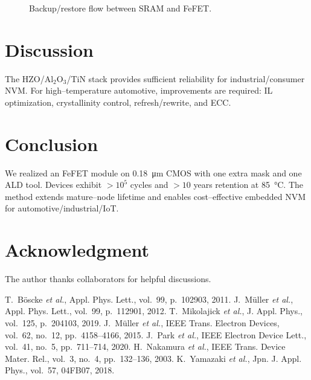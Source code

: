 \documentclass[conference]{IEEEtran}
\begin{document}
\begin{figure}[t]
\centering
{}
\caption{Backup/restore flow between SRAM and FeFET.}
\label{fig:backup}
\end{figure}

\section{Discussion}
The HZO/Al\(_2\)O\(_3\)/TiN stack provides sufficient reliability for industrial/consumer NVM.
For high–temperature automotive, improvements are required: IL optimization, crystallinity control, refresh/rewrite, and ECC.

\section{Conclusion}
We realized an FeFET module on \SI{0.18}{\micro m} CMOS with one extra mask and one ALD tool.
Devices exhibit \(>\!10^{5}\) cycles and \(>\!10\) years retention at \SI{85}{\celsius}.
The method extends mature–node lifetime and enables cost–effective embedded NVM for automotive/industrial/IoT.

\section*{Acknowledgment}
The author thanks collaborators for helpful discussions.

\begin{thebibliography}{99}
 T.~Böscke \emph{et al.}, Appl. Phys. Lett., vol.~99, p.~102903, 2011.
 J.~Müller \emph{et al.}, Appl. Phys. Lett., vol.~99, p.~112901, 2012.
 T.~Mikolajick \emph{et al.}, J. Appl. Phys., vol.~125, p.~204103, 2019.
 J.~Müller \emph{et al.}, IEEE Trans. Electron Devices, vol.~62, no.~12, pp.~4158--4166, 2015.
 J.~Park \emph{et al.}, IEEE Electron Device Lett., vol.~41, no.~5, pp.~711--714, 2020.
 H.~Nakamura \emph{et al.}, IEEE Trans. Device Mater. Rel., vol.~3, no.~4, pp.~132--136, 2003.
 K.~Yamazaki \emph{et al.}, Jpn. J. Appl. Phys., vol.~57, 04FB07, 2018.
\end{thebibliography}
\end{document}
